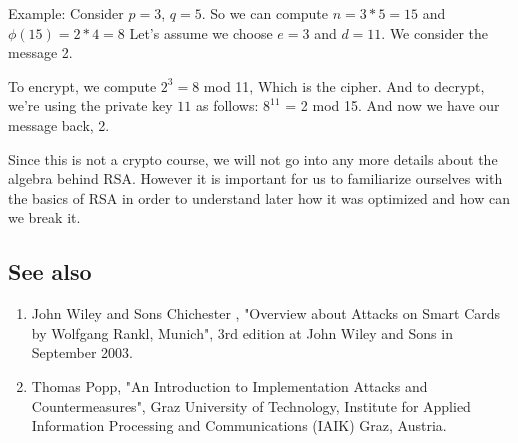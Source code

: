 Example: Consider $p = 3$, $q = 5$. So we can compute $n = 3*5 = 15$ and
$\phi(15) = 2 * 4 = 8$ Let's assume we choose $e = 3$ and $d=11$. We consider
the message 2.

To encrypt, we compute $2^{3} = 8$ mod 11, Which is the cipher. And to decrypt,
we're using the private key $11$ as follows: $8^{11}$ = 2 mod 15. And now we
have our message back, 2.

Since this is not a crypto course, we will not go into any more details
about the algebra behind RSA. However it is important for us to familiarize ourselves
with the basics of RSA in order to understand later how it was optimized and how
can we break it.

\subsection{See also}
\begin{enumerate}
    \item John Wiley and Sons Chichester , "Overview about Attacks on Smart
    Cards by Wolfgang Rankl, Munich", 3rd edition at John Wiley and Sons in
    September 2003.
    \item Thomas Popp, "An Introduction to Implementation Attacks and
    Countermeasures", Graz University of Technology, Institute for Applied
    Information Processing and Communications (IAIK) Graz, Austria.
\end{enumerate}